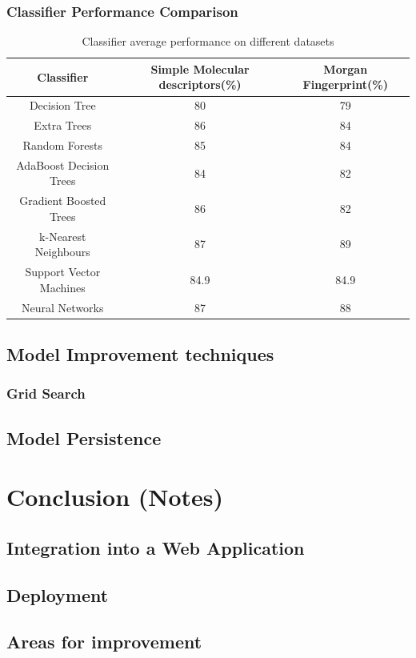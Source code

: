 \documentclass[a4paper,12pt]{report}
\begin{document}
		\subsection{Classifier Performance Comparison}
		\begin{table}[ht]
			\caption{Classifier average performance on different datasets}
			\centering
			\begin{tabular}{c|c|c}	
				\hline\hline
				Classifier & Simple Molecular descriptors(\%) & Morgan Fingerprint(\%) \\
				\hline
				Decision Tree & 80 & 79 \\
				Extra Trees & 86 & 84 \\
				Random Forests & 85 & 84 \\
				AdaBoost Decision Trees & 84 & 82 \\
				Gradient Boosted Trees & 86 & 82 \\
				k-Nearest Neighbours & 87 & 89 \\ 
				Support Vector Machines & 84.9 & 84.9 \\
				Neural Networks & 87 & 88 \\
				\hline
			\end{tabular}
		\end{table}
	\section{Model Improvement techniques}
		\subsection{Grid Search}
	\section{Model Persistence} 
		
		


\chapter{Conclusion (Notes)}
	\section{Integration into a Web Application}
	\section{Deployment}
	\section{Areas for improvement}






\end{document}
